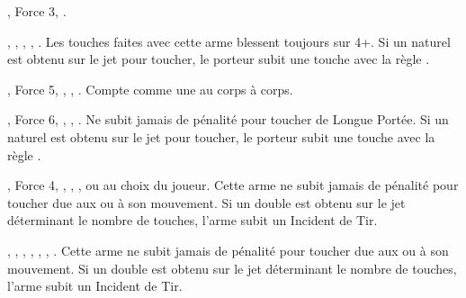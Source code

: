 \closearmyspecialrules






\newpage
\renewcommand{\startarmyarmoury}{\largefontsize}
\startarmyarmoury

\begin{multicols}{2}\raggedcolumns

\subtitle{Armes de Tir}

\startpricelist

\nopricelistitem{\sling} , Force 3, \quicktofire{}.

\nopricelistitem{\gasglobes} , \magicalattacks{}, , \volleyfire{}, \quicktofire{}.\vspace*{3pt}\newline
Les touches faites avec cette arme blessent toujours sur 4+. Si un  naturel est obtenu sur le jet pour toucher, le porteur subit une touche avec la règle \toxicattacks{}.

\nopricelistitem{\ratlockpistol} , Force 5, \magicalattacks{}, , \quicktofire{}.\vspace*{3pt}\newline
Compte comme une \pw{} au corps à corps.

\nopricelistitem{\jezail} , Force 6, \magicalattacks{}, \unwieldy{}, .\vspace*{3pt}\newline
Ne subit jamais de pénalité pour toucher de Longue Portée. Si un  naturel est obtenu sur le jet pour toucher, le porteur subit une touche avec la règle \toxicattacks{}.

\nopricelistitem{\rotarygun} , Force 4, \magicalattacks{}, \volatile{}, \reload{},  ou  au choix du joueur.\vspace*{3pt}\newline
Cette arme ne subit jamais de pénalité pour toucher due aux \multipleshots{} ou à son mouvement. Si un double est obtenu sur le jet déterminant le nombre de touches, l'arme subit un Incident de Tir.

\nopricelistitem{\globelauncher} , \magicalattacks{}, \toxicattacks{}, \volatile{}, \reload{}, \volleyfire{}, .\vspace*{3pt}\newline
Cette arme ne subit jamais de pénalité pour toucher due aux \multipleshots{} ou à son mouvement. Si un double est obtenu sur le jet déterminant le nombre de touches, l'arme subit un Incident de Tir.


\end{multicols}
